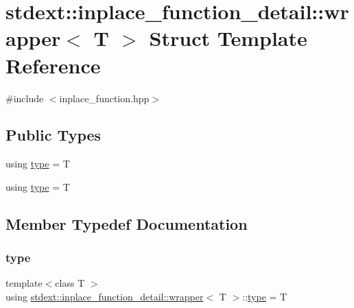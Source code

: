 \hypertarget{structstdext_1_1inplace__function__detail_1_1wrapper}{}\section{stdext\+:\+:inplace\+\_\+function\+\_\+detail\+:\+:wrapper$<$ T $>$ Struct Template Reference}
\label{structstdext_1_1inplace__function__detail_1_1wrapper}


{\ttfamily \#include $<$inplace\+\_\+function.\+hpp$>$}

\subsection*{Public Types}
\begin{DoxyCompactItemize}
\item 
using \hyperlink{structstdext_1_1inplace__function__detail_1_1wrapper_a8ffe3ee24387462eac3adb955deba564}{type} = T
\item 
using \hyperlink{structstdext_1_1inplace__function__detail_1_1wrapper_a8ffe3ee24387462eac3adb955deba564}{type} = T
\end{DoxyCompactItemize}


\subsection{Member Typedef Documentation}
\mbox{\label{structstdext_1_1inplace__function__detail_1_1wrapper_a8ffe3ee24387462eac3adb955deba564}} 
\subsubsection{\texorpdfstring{type}{type}\hspace{0.1cm}{\footnotesize\ttfamily [1/2]}}
{\footnotesize\ttfamily template$<$class T $>$ \\
using \hyperlink{structstdext_1_1inplace__function__detail_1_1wrapper}{stdext\+::inplace\+\_\+function\+\_\+detail\+::wrapper}$<$ T $>$\+::\hyperlink{structstdext_1_1inplace__function__detail_1_1wrapper_a8ffe3ee24387462eac3adb955deba564}{type} =  T}

